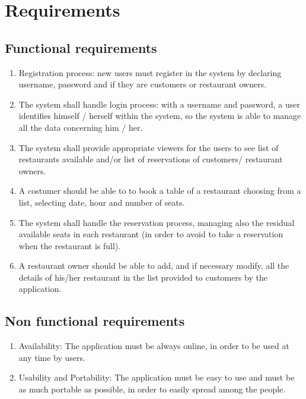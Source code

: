 \section{Requirements}
\subsection{Functional requirements}

\begin{enumerate}
\item Registration process: new users must register in the system by declaring username, password and if they are customers or restaurant owners.
\item The system shall handle login process: with a username and password, a user identifies himself / herself within the system, so the system is able to manage all the data concerning him / her.
\item The system shall provide appropriate viewers for the users to see list of restaurants available and/or list of reservations of customers/ restaurant owners.
\item A costumer should be able to to book a table of a restaurant choosing from a list, selecting date, hour and number of seats.
\item The system shall handle the reservation process, managing also the residual available seats in each restaurant (in order to avoid to take a reservation when the restaurant is full).
\item A restaurant owner should be able to add, and if necessary modify, all the details of his/her restaurant in the list provided to customers by the application.
\end{enumerate}

\subsection{Non functional requirements}
\begin{enumerate}
	\item Availability: The application must be always online, in order to be used at any time by users.
	\item Usability and Portability: The application must be easy to use and
		must be as much portable as possible, in order to easily spread among
		the people. 
\end{enumerate}
